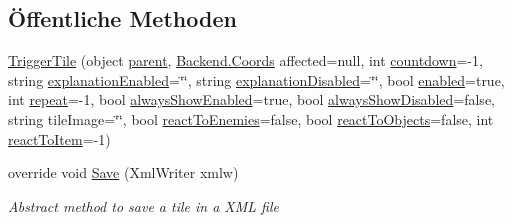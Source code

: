 \subsection*{Öffentliche Methoden}
\begin{DoxyCompactItemize}
\item 
\hyperlink{class_gruppe22_1_1_backend_1_1_trigger_tile_a03bd513e6f5e5b3f157f2180690dcf58}{Trigger\-Tile} (object \hyperlink{class_gruppe22_1_1_backend_1_1_tile_abc12933c70eb3a2ebbb2fde9f45c2632}{parent}, \hyperlink{class_gruppe22_1_1_backend_1_1_coords}{Backend.\-Coords} affected=null, int \hyperlink{class_gruppe22_1_1_backend_1_1_trigger_tile_ab08397e9333dd8919b26f995f0f7ebd1}{countdown}=-\/1, string \hyperlink{class_gruppe22_1_1_backend_1_1_trigger_tile_ad2ea9d9d7ab8c6a937593929df65721e}{explanation\-Enabled}=\char`\"{}\char`\"{}, string \hyperlink{class_gruppe22_1_1_backend_1_1_trigger_tile_a2ef73950ef42dbe8750eec02e6c22ff6}{explanation\-Disabled}=\char`\"{}\char`\"{}, bool \hyperlink{class_gruppe22_1_1_backend_1_1_trigger_tile_a351f5ab67455ea6aaacc7c896dc9dd73}{enabled}=true, int \hyperlink{class_gruppe22_1_1_backend_1_1_trigger_tile_a29981898e62139b1265b69fafa391a30}{repeat}=-\/1, bool \hyperlink{class_gruppe22_1_1_backend_1_1_trigger_tile_a269d0236bc5ef45254b790fcc04e4271}{always\-Show\-Enabled}=true, bool \hyperlink{class_gruppe22_1_1_backend_1_1_trigger_tile_a92654a211c0fa73998ef5ce5f8984acc}{always\-Show\-Disabled}=false, string tile\-Image=\char`\"{}\char`\"{}, bool \hyperlink{class_gruppe22_1_1_backend_1_1_trigger_tile_a0ef4ea33a7f4bfb152ecb185f341dbca}{react\-To\-Enemies}=false, bool \hyperlink{class_gruppe22_1_1_backend_1_1_trigger_tile_a943cb609d614ccc043c8aa8160c6a563}{react\-To\-Objects}=false, int \hyperlink{class_gruppe22_1_1_backend_1_1_trigger_tile_a0babf38976b0c1d4b6510d031c893f46}{react\-To\-Item}=-\/1)
\item 
override void \hyperlink{class_gruppe22_1_1_backend_1_1_trigger_tile_a218716e27c1c692f05e0b538b30dcc59}{Save} (Xml\-Writer xmlw)
\begin{DoxyCompactList}\small\item\em Abstract method to save a tile in a X\-M\-L file \end{DoxyCompactList}\end{DoxyCompactItemize}
